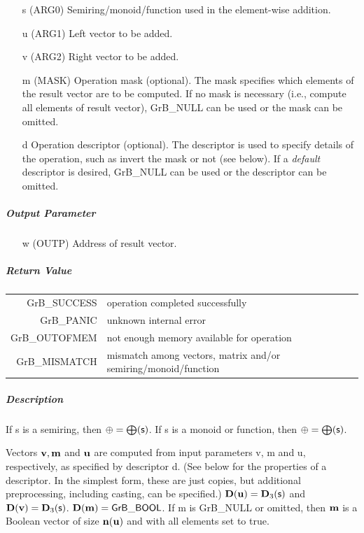 \documentclass[11pt]{extarticle}
\begin{document}
\begin{itemize}
	\item[{\sf s}] ({\sf ARG0}) Semiring/monoid/function used in the element-wise addition.

	\item[{\sf u}] ({\sf ARG1}) Left vector to be added.

	\item[{\sf v}] ({\sf ARG2}) Right vector to be added.

	\item[{\sf m}] ({\sf MASK}) Operation mask (optional). The mask
	specifies which elements of the result vector are to be computed.
	If no mask is necessary (i.e., compute all elements of result
	vector), {\sf GrB\_NULL} can be used or the mask can be omitted.

	\item[{\sf d}] Operation descriptor (optional). The descriptor
	is used to specify details of the operation, such as 
	invert the mask or not (see below). If a
	\emph{default} descriptor is desired, {\sf GrB\_NULL} can be
	used or the descriptor can be omitted.
\end{itemize}

\subparagraph{Output Parameter}

\begin{itemize}
	\item[{\sf w}] ({\sf OUTP}) Address of result vector.
\end{itemize}

\subparagraph{Return Value}

\begin{tabular}{rl} 
{\sf GrB\_SUCCESS} 	& operation completed successfully \\
{\sf GrB\_PANIC}	& unknown internal error \\
{\sf GrB\_OUTOFMEM}	& not enough memory available for operation \\
{\sf GrB\_MISMATCH}	& mismatch among vectors, matrix and/or semiring/monoid/function
\end{tabular}

\subparagraph{Description}

If {\sf s} is a semiring, then $\oplus = \bigoplus({\sf s})$. 
If {\sf s} is a monoid or function, then $\oplus = \bigoplus({\sf s})$.

Vectors ${\bf v}, {\bf m}$ and ${\bf u}$ are computed from
input parameters {\sf v}, {\sf m} and {\sf u}, respectively, as specified
by descriptor {\sf d}. (See below for the properties of a descriptor. In
the simplest form, these are just copies, but additional preprocessing,
including casting, can be specified.)  $\bold{D}({\bf u}) =
\bold{D}_3({\sf s})$ and $\bold{D}({\bf v}) = \bold{D}_3({\sf s})$.
$\bold{D}({\bf m}) = {\sf GrB\_BOOL}$.  If {\sf m} is {\sf GrB\_NULL} or omitted,
then ${\bf m}$ is a Boolean vector of size $\bold{n}({\bf u})$
and with all elements set to {\sf true}.
\end{document}
